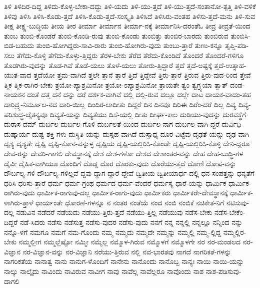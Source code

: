 {ತಿಳಿ
ತಿಳಿದಿರ-ದಿದ್ದ
ತಿಳಿದು-ಕೊಳ್ಳ-ಬೇಕಾ-ದದ್ದು
ತಿಳಿ-ಯದು
ತಿಳಿ-ಯು-ತ್ತದೆ
ತಿಳಿ-ಯು-ತ್ತದೆ-ಸಂತಾನೋ-ತ್ಪತ್ತಿ
ತಿಳಿ-ವಳಿಕೆ
ತಿಳಿವು
ತಿಳಿಸಿ
ತಿಳಿಸಿ-ಕೊಡು-ತ್ತದೆ
ತಿಳಿಸಿ-ಕೊಡು-ತ್ತದೆ-ಸಂಸ್ಕೃತಿ
ತಿಳಿಸಿದೆ
ತಿಳಿಸಿರು-ವಂತಹ
ತಿಳಿಸು-ತ್ತದೆ-ಮನು
ತಿಳಿ-ಸುವ
ತೀಕ್ಷ
ತೀಕ್ಷ್ಣ-ಬುದ್ಧಿಯ
ತೀಯ
ತೀರ
ತೀರ್ಮಾ
ತೀರ್ಮಾನ
ತೀರ್ಮಾ-ನಕ್ಕೆ
ತೀರ್ಮಾನಿಸಿ-ದರಂತೆಓ
ತೀವ್ರ
ತೀವ್ರತೆ-ಯಿಂದ
ತುಂಬ
ತುಂಬಿ-ಕೊಂಡರೆ
ತುಂಬಿ-ಕೊಂಡಿ-ರುವು
ತುಂಬಿ-ಕೊಂಡು
ತುಂಬಿತ್ತು
ತುಂಬಿರ-ಬಾರದು
ತುಂಬಿರುವ
ತುಂಬಿಸಿ-ಬಿಡ-ಬಹುದು
ತುಂಬಿ-ಹೋಗಿದ್ದರು-ಸಾವಿ-ರಾರು
ತುಂಬಿ-ಹೋಗಿರು-ವುದು
ತುಂಬು-ತ್ತಾರೆ
ತುಣು-ಕನ್ನೂ
ತೃಪ್ತಿ-ಪಡಿ-ಸಲು
ತೆಗೆದು-ಕೊಳ್ಳಿ
ತೆಗೆದು-ಕೊಳ್ಳು-ತ್ತಿದ್ದರು
ತೆರಳ-ಬೇಕು
ತೆರೆದ
ತೆರೆದು-ಕೊಂಡಿದೆ
ತೊಂದರೆ
ತೊಂದರೆ-ಗಳಿಗೂ
ತೊಡಗಿರು-ವುದನ್ನು
ತೊಡ-ಗಿವೆ
ತೊಡೆ-ಯಲು
ತೊಳೆ-ಯಲು
ತೋರು-ತ್ತಿದ್ದಾರೆ
ತ್ತದೆ
ತ್ತದೆ-ಅಷ್ಟಕ್ಕೆ
ತ್ತದೆ-ಉತ್ಸಾಹ-ಯುತ-ವಾದ
ತ್ತದೆಯೋ
ತ್ತಮ-ವಾಗಿದೆ
ತ್ತಲೇ
ತ್ತಾನೆ
ತ್ತಾರೆ
ತ್ತಿದೆ
ತ್ತಿದ್ದೇವೆ
ತ್ತಿರು-ತ್ತಾರೆ
ತ್ತಿರುವ
ತ್ತಿರು-ವುದ-ರಿಂದ
ತ್ತೇವೆ
ತ್ಮಿಕ
ತ್ಮಿಕ-ರಾಗಿರ-ಬೇಕು
ತ್ರಯೋ-ಪ್ಯಾಶ್ರಮಿನೋ
ತ್ರಯೋ-ಽಪ್ಯಾಶ್ರಮಿನೋ
ತ್ರಾಯತೇ
ತ್ವಂ
ತ್ವಗ್ರ್ಯಯಾ
ತ್ವಾತ್
ದಂಡ-ನಾಯಕನ
ದಂತೆ
ದತ್ತ
ದನೆ
ದನ್ನು
ದರೆ
ದರ್ಶಕ-ವಾಗಿವೆ
ದಲ್ಲಿ
ದಲ್ಲಿ-ರುವ
ದಲ್ಲೂ
ದಲ್ಲೇ
ದಾಟ
ದಾಯಕ-ವಾದಂ-ತಹ
ದಾರಿದ್ರ್ಯ-ನಿರ್ಮೂಲ-ನದ
ದಾರಿ-ಯಿಲ್ಲ
ದಿಂದಿರ-ಲಾದೀತು
ದಿದ್ದರೆ
ದಿನ
ದಿನವೂ
ದಿರಿಈ
ದಿರೆಂ-ದರೆ
ದಿಲ್ಲ
ದಿವ್ಯ
ದಿವ್ಯ-ಪರಿಶುದ್ಧ-ಚೈತನ್ಯವೂ
ದಿವ್ಯತೆ-ಯನ್ನು
ದಿವ್ಯತೆಯು
ದಿಸೆ-ಯಲ್ಲಿ
ದೀತು
ದೀರ್ಘ-ಕಾಲ
ದುಡಿಯು-ವುದನ್ನು
ದುರವಸ್ಥೆಗೆ
ದುರಾಸ-ದಮ್
ದುರ್ಬಲ
ದುರ್ಬಲ-ಗೊಳಿ
ದುರ್ಬಲತೆ-ಯಿಂದ
ದುರ್ಬಲ-ನಾಗ
ದುರ್ಬಲ-ವಾಗಿ-ದ್ದರೆ
ದುರ್ವಿಧಿ
ದುಷ್ಕಾರ್ಯ
ದುಷ್ಟ-ಶಕ್ತಿ-ಗಳು
ದುಸ್ಥಿತಿ-ಯನ್ನು
ದುಸ್ಸಹ-ವಾಗಿದೆ
ದುಸ್ಸಾಧ್ಯ
ದೂರ-ವಿಟ್ಟೆವು
ದೃಢತೆ-ಯನ್ನು
ದೃಢ-ವಾಗಿ
ದೃಶ್ಯ
ದೃಶ್ಯತೇ
ದೃಷ್ಟಿ
ದೃಷ್ಟಿ-ಕೋನ-ವನ್ನುಳ್ಳ
ದೃಷ್ಟಿಯ
ದೃಷ್ಟಿ-ಯಲ್ಲಿರಿಸಿ-ಕೊಂಡೇ
ದೃಷ್ಟಿ-ಯಲ್ಲಿರಿಸಿ-ಕೊಳ್ಳಿ
ದೇನಿ-ದ್ದರೂ
ದೇವ-ರನ್ನು
ದೇವರಿ-ಗಾಗಲಿ
ದೇವಸ್ಥಾನಕ್ಕೆ
ದೇಶ
ದೇಶ-ಗಳೋ
ದೇಶದ
ದೇಶಾಂತರ-ವನ್ನು
ದೇಹ
ದೇಹ-ಬುದ್ಧಿ-ಗಳ
ದೈವೀ
ದೈಹಿಕ-ವಾಗಿಯೂ
ದೊಂದಿಗೆ
ದೊಡ್ಡ
ದೊರ
ದೊರಕು-ವುದು
ದೊರೆಯು-ತ್ತದೆ
ದೋಣಿ
ದೋಷ-ವನ್ನು
ದೌರ್ಬಲ್ಯ-ಗಳಿ
ದೌರ್ಬಲ್ಯ-ಗಳಿಲ್ಲವೆ
ದ್ದವು
ದ್ದಾಗ
ದ್ದಾರೆ
ದ್ದೇವೆ
ದ್ವಿತೀಯ
ದ್ವಿತೀಯಾರ್ಧ-ದಲ್ಲಿ
ಧನ-ಸಂಪತ್ತನ್ನು
ಧನ್ಯತೆಗೆ
ಧರಿಸಿ
ಧರಿಸು-ತ್ತಾರೆ
ಧರ್ಮ
ಧರ್ಮ-ಗ್ರಂಥ
ಧರ್ಮದ
ಧರ್ಮ-ವೆಂದರೆ
ಧರ್ಮಸ್ಯ
ಧಾರೆ-ಯನ್ನು
ಧಾರ್ಮಿಕ
ಧಾರ್ಮಿಕ-ರಾಗಿರು-ವುದು
ಧಾರ್ಮಿಕ-ರಾಗುವು-ದಲ್ಲ
ಧಾರ್ಮಿಕ-ರಾಗು-ವುದು
ಧಾರ್ಮಿಕರು
ಧಾರ್ಮಿಕರೇ-ದೇವಸ್ಥಾನಕ್ಕೆ
ಧಾರ್ಮಿಕ-ಳಾಗಿರು-ತ್ತಾಳೆ
ಧಾರ್ಯಂತೇ
ಧೋರಣೆ-ಗಳನ್ನೂ
ನ
ನಂತರ
ನಂತೆಯೆ
ನಂದ
ನಂಬಿ
ನಂಬಿಕೆ
ನಚಿಕೇತ-ನಿಗೆ
ನಟಿಸುವು-ದಲ್ಲ
ನಡುವಿನ
ನಡೆದರೆ
ನಡೆಯದು
ನಡೆಯು-ತ್ತಿರು-ತ್ತದೆ
ನಡೆಯು-ತ್ತಿಲ್ಲ
ನಡೆಯುವು
ನಡೆಸ-ಬೇಕು
ನಡೆಸ-ಬೇಕೆಂ-ದಿದ್ದರೆ
ನಡೆ-ಸಿದರು
ನಡೆಸು
ನಡೆಸುತ್ತ
ನಡೆಸು-ವುದರ
ನಡೆಸು-ವುದು
ನನಗೆ
ನನ್ನ
ನನ್ನಲ್ಲಿ
ನನ್ನಲ್ಲೂ
ನನ್ನಿಂದ
ನನ್ನು
ನನ್ನೊ-ಳಗೆ
ನಮಗೂ
ನಮಗೆ
ನಮ-ಗೊಂದು
ನಮ್ಮ
ನಮ್ಮದು
ನಮ್ಮದೇ
ನಮ್ಮನ್ನು
ನಮ್ಮಲ್ಲಿ
ನಮ್ಮ-ಲ್ಲಿದ್ದ
ನಮ್ಮಲ್ಲಿರ-ಬೇಕು
ನಮ್ಮಲ್ಲೀಗ
ನಮ್ಮಲ್ಲೆಷ್ಟೋ
ನಮ್ಮೀ
ನಮ್ಮೆಲ್ಲ
ನಮ್ಮೊಳ-ಗಿರುವ
ನಮ್ಮೊಳಗೆ
ನಮ್ಮೊಳಗೇ
ನರ
ನರ-ಮಂಡಲದ
ನರ-ವಿಜ್ಞಾನ
ನರ-ವಿಜ್ಞಾನ-ವನ್ನು
ನರ-ವಿಜ್ಞಾನಿ
ನರೆಯು-ತ್ತಿರುವ
ನಲ್ಲಿ
ನವ-ಭಾರತವು
ನಾಗದೆ
ನಾಗರಿಕತೆ-ಗಳನ್ನು
ನಾಗರಿಕತೆಯ
ನಾನಾತ್ವ
ನಾನು
ನಾನುಗ-ಳೊಂದಿಗೆ
ನಾನೇನು
ನಾನೊಂದು
ನಾನೊಬ್ಬ
ನಾನ್ಯಃ
ನಾಯಿ
ನಾಯಿ-ಯನ್ನು
ನಾಲ್ಕು
ನಾಲ್ಕೈದು
ನಾವಿಂದು
ನಾವಿರುವ
ನಾವೀಗ
ನಾವು
ನಾವೆಲ್ಲ
ನಾವೆಲ್ಲರೂ
ನಾವೊಂದು
ನಾಶ
ನಾಶ-ಪಡಿಸುವು-ದಾಗಲಿ
}
